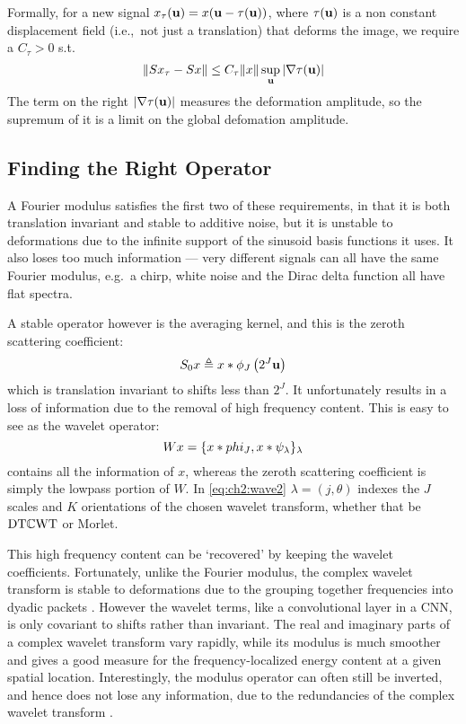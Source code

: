   Formally, for a new signal
  $x_{\tau}(\mathbf{u}) = x(\mathbf{u}-\tau(\mathbf{u}))$, where $\tau(\mathbf{u})$ is a non
  constant displacement field (i.e.,\ not just a translation) that deforms the
  image, we require a $C_\tau>0$ s.t.
  \protect\begin{equation}\label{eq:scat_deformation_stability}
    \|S x_{\tau} - S x \| \leq C_\tau \|x\| \sup_{\mathbf{u}} |\nabla\tau(\mathbf{u})|
  \protect\end{equation}
  The term on the right $|\nabla\tau(\mathbf{u})|$ measures the deformation
  amplitude, so the supremum of it is a limit on the global defomation amplitude.

\subsection{Finding the Right Operator}
  A Fourier modulus satisfies the first two of these requirements, in that it is
  both translation invariant and stable to additive noise, but it is unstable to
  deformations due to the infinite support of the sinusoid basis functions it
  uses. It also loses too much information --- very different signals can all
  have the same Fourier modulus, e.g.\ a chirp, white noise and the Dirac delta
  function all have flat spectra.

  A stable operator however is the averaging kernel, and
  this is the zeroth scattering coefficient:
  \begin{equation}
    S_0x \triangleq x \ast \phi_J\left(2^J \mathbf{u}\right)
  \end{equation}
  which is translation invariant to shifts less than $2^J$. It unfortunately
  results in a loss of information due to the removal of high frequency content.
  This is easy to see as the wavelet operator:
\begin{equation}
  Wx = \{ x \ast phi_J, x \ast \psi_\lambda \}_\lambda \label{eq:ch2:wave2}
\end{equation}
contains all the information of $x$, whereas the zeroth scattering coefficient
is simply the lowpass portion of $W$. In \eqref{eq:ch2:wave2} $\lambda = (j,
\theta)$ indexes the $J$ scales and $K$ orientations of the chosen wavelet
transform, whether that be $\mathrm{DT}\mathbb{C}\mathrm{WT}$ or Morlet.

This high frequency content can be `recovered' by keeping the wavelet
coefficients. Fortunately, unlike the Fourier modulus, the complex wavelet
transform is stable to deformations due to the grouping together frequencies
into dyadic packets \cite{mallat_group_2012}. 
However the wavelet terms, like a convolutional layer in a CNN, is only 
covariant to shifts rather than invariant.  
The real and imaginary parts of a complex wavelet transform 
vary rapidly, while its modulus is much smoother and gives a good
measure for the frequency-localized energy content at a given spatial
location. Interestingly, the modulus operator can often still be inverted, and hence
does not lose any information, due to the redundancies of the complex wavelet transform
\cite{waldspurger_phase_2012}.

